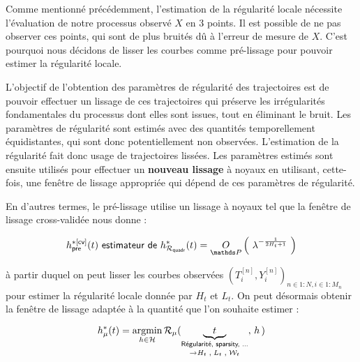 
Comme mentionné précédemment, l'estimation de la régularité locale nécessite l'évaluation de notre processus observé $X$ en 3 points. Il est possible de ne pas observer ces points, qui sont de plus bruités dû à l'erreur de mesure de $X$. C'est pourquoi nous décidons de lisser les courbes comme \og pré-lissage \fg pour pouvoir estimer la régularité locale.


L'objectif de l'obtention des paramètres de régularité des trajectoires est de pouvoir effectuer un lissage de ces trajectoires qui préserve les irrégularités fondamentales du processus dont elles sont issues, tout en éliminant le bruit. Les paramètres de régularité sont estimés avec des quantités temporellement équidistantes, qui sont donc potentiellement non observées. L'estimation de la régularité fait donc usage de trajectoires lissées. Les paramètres estimés sont ensuite utilisés pour effectuer un \textbf{nouveau lissage} à noyaux en utilisant, cette-fois, une fenêtre de lissage appropriée qui dépend de ces paramètres de régularité.

\smallskip

\noindent En d'autres termes, le pré-lissage utilise un lissage à noyaux tel que la fenêtre de lissage cross-validée nous donne :

\begin{equation}
	h^{*[\textsf{cv}]}_{\textsf{pre}}(t) \textsf{ estimateur de } h^*_{\mathcal R_{\textsf{quadr}}}(t) = \grandop{ \lambda^{- \frac 1 {2  H_t + 1}}} \label{eq:h_cross_noyau_pre}
\end{equation}

\noindent à partir duquel on peut lisser les courbes observées $( T_i^{[n]}, Y_i^{[n]} )_{n \in 1:N, i \in 1:M_n}$ pour estimer la régularité locale donnée par $H_t$ et $L_t$. On peut désormais obtenir la fenêtre de lissage adaptée à la quantité que l'on souhaite estimer :

\begin{equation}
	h_\mu^*(t) = \argmin\limits_{h \in \mathcal H} \mathcal R_\mu(\underset {\rightarrow H_t \;, \; L_t \; , \; \mathcal W_t}{\underbrace{\quad t \quad}_{\textsf{Régularité, sparsity, ...}}}, \, h \, )
\end{equation}



